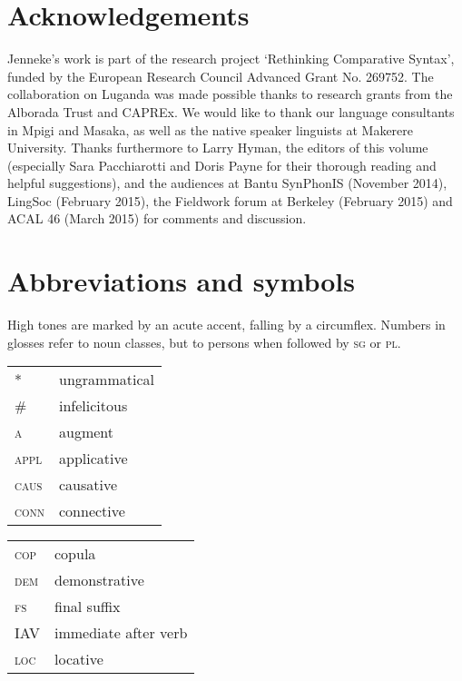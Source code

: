 \documentclass[output=paper]{langsci/langscibook}
\begin{document}
\section*{Acknowledgements}

Jenneke’s work is part of the research project ‘Rethinking Comparative Syntax’, funded by the European Research Council Advanced Grant No. 269752. The collaboration on Luganda was made possible thanks to research grants from the Alborada Trust and CAPREx. We would like to thank our language consultants in Mpigi and Masaka, as well as the native speaker linguists at Makerere University. Thanks furthermore to Larry Hyman, the editors of this volume (especially Sara Pacchiarotti and Doris Payne for their thorough reading and helpful suggestions), and the audiences at Bantu SynPhonIS (November 2014), LingSoc (February 2015), the Fieldwork forum at Berkeley (February 2015) and ACAL 46 (March 2015) for comments and discussion.

\section*{Abbreviations and symbols}

High tones are marked by an acute accent, falling by a circumflex. Numbers in glosses refer to noun classes, but to persons when followed by \textsc{sg} or \textsc{pl}.
\medskip 

\begin{tabularx}{.45\textwidth}{lX}
* & ungrammatical\\
\# & infelicitous \\
\textsc{a} & augment \\
\textsc{appl} & applicative \\
\textsc{caus} & causative \\
\textsc{conn} & connective \\
\end{tabularx}
\begin{tabularx}{.45\textwidth}{lX}
\textsc{cop} & copula \\
\textsc{dem} & demonstrative \\
\textsc{fs} & final suffix \\
IAV & immediate after verb \\
\textsc{loc} & locative \\
\end{tabularx} 
\end{document}
